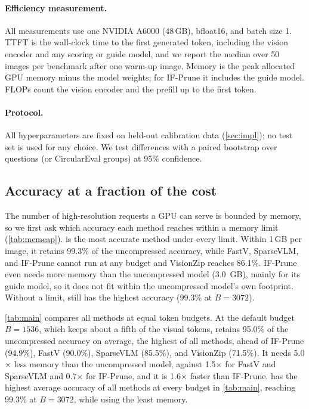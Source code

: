 \paragraph{Efficiency measurement.}
All measurements use one NVIDIA A6000 (48\,GB), bfloat16, and batch size 1. TTFT is the wall-clock time
to the first generated token, including the vision encoder and any scoring or guide model, and we report the median over 50 images per benchmark after one warm-up image. Memory is the peak
allocated GPU memory minus the model weights; for IF-Prune it includes the guide model. FLOPs count the
vision encoder and the prefill up to the first token.

\paragraph{Protocol.}
All \method hyperparameters are fixed on held-out calibration data (\cref{sec:impl}); no test set is used
for any choice. We test differences with a paired bootstrap over questions (or CircularEval groups) at
95\% confidence.

\subsection{Accuracy at a fraction of the cost}
\label{sec:main}



The number of high-resolution requests a GPU can serve is bounded by memory, so we first ask which
accuracy each method reaches within a memory limit (\cref{tab:memcap}). \method is the most accurate
method under every limit. Within 1\,GB per image, it retains 99.3\% of the uncompressed accuracy, while
FastV, SparseVLM, and IF-Prune cannot run at any budget and VisionZip reaches 86.1\%. IF-Prune even needs
more memory than the uncompressed model (3.0 \,GB), mainly for its guide model, so it does not fit
within the uncompressed model's own footprint. Without a limit, \method still has the highest accuracy
(99.3\% at $B=3072$).

\cref{tab:main} compares all methods at equal token budgets. At the default budget $B=1536$, which keeps
about a fifth of the visual tokens, \method retains 95.0\% of the uncompressed accuracy on average, the
highest of all methods, ahead of IF-Prune (94.9\%), FastV (90.0\%), SparseVLM (85.5\%), and VisionZip
(71.5\%). It needs 5.0$\times$ less memory than the uncompressed model, against 1.5$\times$ for FastV and SparseVLM and
0.7$\times$ for IF-Prune, and it is 1.6$\times$ faster than IF-Prune. \method has the highest
average accuracy of all methods at every budget in \cref{tab:main}, reaching 99.3\% at $B=3072$, while
using the least memory.

